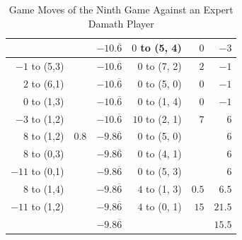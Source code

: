 \begin{appendices}
\begin{table}[H]
\begin{tabular}{rrrrrr}
                         &                &  $-10.\overline6$ &   $0$ to (5, 4) & $0$        &  $-3$    \\ \hline
          $-1$ to (5,3)  &                &  $-10.\overline6$ &   $0$ to (7, 2) & $2$        &  $-1$    \\ \hline
          $2$ to (6,1)  &                &  $-10.\overline6$ &   $0$ to (5, 0) & $0$        &  $-1$    \\ \hline
          $0$ to (1,3)  &                &  $-10.\overline6$ &   $0$ to (1, 4) & $0$        &  $-1$    \\ \hline
          $-3$ to (1,2)  &                &  $-10.\overline6$ &   $10$ to (2, 1) & $7$        &  $6$    \\ \hline
          $8$ to (1,2)  & $0.8$           &  $-9.8\overline6$ &   $0$ to (5, 0) &            &  $6$    \\ \hline
          $8$ to (0,3)  &                 &  $-9.8\overline6$ &   $0$ to (4, 1) &            &  $6$    \\ \hline
          $-11$ to (0,1)  &               &  $-9.8\overline6$ &   $0$ to (5, 3) &            &  $6$    \\ \hline
          $8$ to (1,4)  &                  &  $-9.8\overline6$ &   $4$ to (1, 3) & $0.5$      &  $6.5$    \\ \hline
          $-11$ to (1,2)  &                &  $-9.8\overline6$ &   $4$ to (0, 1) & $15$      &  $21.5$    \\ \hline \hline
                          &                &  $-9.8\overline6$ &                 &           &  $15.5$    \\ \hline 
    \end{tabular}
    \caption{Game Moves of the Ninth Game Against an Expert Damath Player}
    \label{tab:ninth-game}
\end{table}


\end{appendices}
